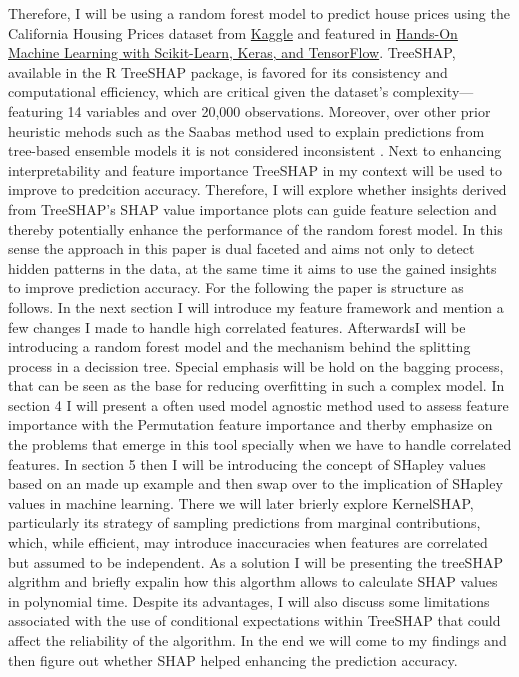 \documentclass[12pt]{article}
\begin{document}
Therefore,  I will be using a random forest model to predict house prices using the California Housing Prices dataset from \href{https://www.kaggle.com/datasets/camnugent/california-housing-prices}{Kaggle} and featured in \href{https://www.oreilly.com/library/view/hands-on-machine-learning/9781492032632/}{Hands-On Machine Learning with Scikit-Learn, Keras, and TensorFlow}.
TreeSHAP, available in the R TreeSHAP package, is favored for its consistency and computational efficiency, which are critical given the dataset's complexity—featuring 14 variables and over 20,000 observations.
Moreover, over other prior heuristic mehods such as the Saabas method used to explain predictions from tree-based ensemble models it is not considered inconsistent \cite{lundberg2019consistent}.
Next to enhancing interpretability and feature importance TreeSHAP in my context will be used to improve to predcition accuracy.
Therefore, I will explore whether insights derived from TreeSHAP's SHAP value importance plots can guide feature selection and thereby potentially enhance the performance of the random forest model.
In this sense the approach in this paper is dual faceted and aims not only to detect hidden patterns in the data, at the same time it aims to use the gained insights to improve prediction accuracy. 
For the following the paper is structure as follows. In the next section I will introduce my feature framework and mention a few changes I made to handle high correlated features.
AfterwardsI will be introducing a random forest model and the mechanism behind the splitting process in a decission tree.
Special emphasis will be hold on the bagging process, that can be seen as the base for reducing overfitting in such a complex model. In section 4 I will present a often used model agnostic method used to assess feature importance with the Permutation feature importance and therby emphasize on the problems that emerge in this tool specially when we have to handle correlated features.  In section 5 then I will be introducing the concept of SHapley values based on an made up example and then swap over to the implication of SHapley values in machine learning.
There we will later brierly explore KernelSHAP, particularly its strategy of sampling predictions from marginal contributions, which, while efficient, may introduce inaccuracies when features are correlated but assumed to be independent. As a solution I will be presenting the treeSHAP algrithm and briefly expalin how this algorthm allows to calculate SHAP values in polynomial time.
 Despite its advantages, I will also discuss some limitations associated with the use of conditional expectations within TreeSHAP that could affect the reliability of the algorithm. In the end we will come to my findings and then figure out whether SHAP helped enhancing the prediction accuracy.
\end{document}

